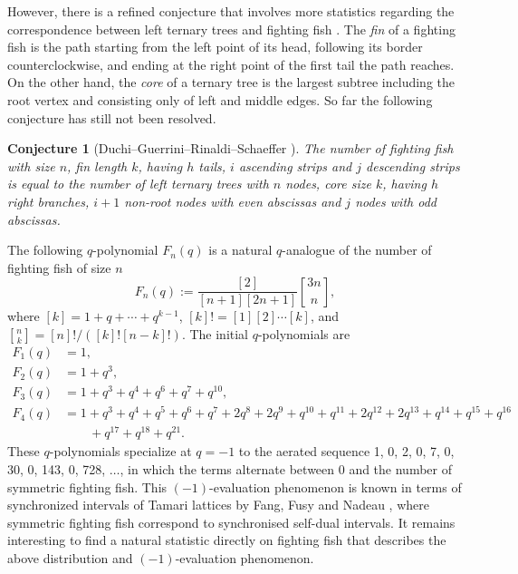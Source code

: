 \documentclass[a4paper,11pt,reqno]{amsart}
\newtheorem{con}[lem]{Conjecture}
\theoremstyle{definition}
\numberwithin{equation}{section}
\begin{document}
However, there is a refined conjecture that involves more statistics regarding the correspondence between left ternary trees  and fighting fish \cite{DGRS-B}. The \emph{fin} of a fighting fish is the path starting from the left point of its head, following its border counterclockwise, and ending at the right point of the first tail the path reaches. On the other hand, the \emph{core} of a ternary tree is the largest subtree including the root vertex and consisting only of left and middle edges. So far the following conjecture has still not been resolved.

\begin{con}[Duchi--Guerrini--Rinaldi--Schaeffer \cite{DGRS-B}]
The number of fighting fish with size $n$, fin length $k$, having $h$ tails, $i$ ascending strips and $j$ descending strips is equal to the number of left ternary trees with $n$ nodes, core size $k$, having $h$ right branches, $i+1$ non-root nodes with even abscissas and $j$ nodes with odd abscissas.
\end{con}

The following $q$-polynomial $F_n(q)$ is a natural $q$-analogue of the number of fighting fish of size $n$
\begin{equation*}
F_n(q):=\frac{[2]}{[n+1][2n+1]}{3n\brack n},
\end{equation*}
where $[k]=1+q+\cdots+q^{k-1}$, $[k]!=[1][2]\cdots [k]$, and ${n\brack k}=[n]!/([k]![n-k]!)$.
The initial $q$-polynomials are
\begin{align*}
F_1(q) &=1, \\
F_2(q) &=1+q^3,\\
F_3(q) &=1+q^3+q^4+q^6+q^7+q^{10}, \\
F_4(q) &=1+q^3+q^4+q^5+q^6+q^7+2q^8+2q^9+q^{10}+q^{11}+2q^{12}+2q^{13}+q^{14}+q^{15}+q^{16} \\
 &\qquad +q^{17}+q^{18}+q^{21}.
\end{align*}
These $q$-polynomials specialize at $q=-1$ to the aerated sequence 1, 0, 2, 0, 7, 0, 30, 0, 143, 0, 728, $\dots$, 
in which the terms alternate between 0 and the number of symmetric fighting fish. This $(-1)$-evaluation phenomenon is known in terms of synchronized intervals of Tamari lattices by Fang, Fusy and Nadeau \cite[Section 6.4]{FFN-2025}, where symmetric fighting fish correspond to synchronised self-dual intervals. It remains interesting to find a natural statistic directly on fighting fish  that describes the above distribution and $(-1)$-evaluation phenomenon.
\end{document}
